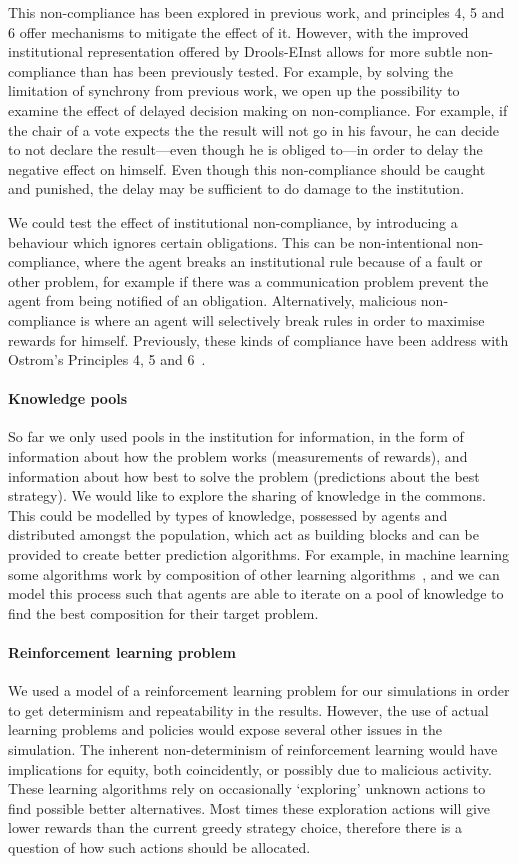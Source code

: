 This non-compliance has been explored in previous work, and principles
4, 5 and 6 offer mechanisms to mitigate the effect of it. However, with the
improved institutional representation offered by Drools-EInst allows for more
subtle non-compliance than has been previously tested. For example, by solving
the limitation of synchrony from previous work, we open up the possibility to
examine the effect of delayed decision making on non-compliance. For example,
if the chair of a vote expects the the result will not go in his favour, he
can decide to not declare the result---even though he is obliged to---in order to delay
the negative effect on himself. Even though this non-compliance should be
caught and punished, the delay may be sufficient to do damage to the
institution.

We could test the effect of
institutional non-compliance, by introducing a behaviour which ignores certain
obligations. This can be non-intentional non-compliance, where the agent
breaks an institutional rule because of a fault or other problem, for example
if there was a communication problem prevent the agent from being notified of
an obligation. Alternatively, malicious non-compliance is where an agent will
selectively break rules in order to maximise rewards for himself. Previously,
these kinds of compliance have been address with Ostrom's Principles 4, 5 and
6~\citep{Pitt2012b}.  

\paragraph{Knowledge pools} So far we only used pools in the institution for
information, in the form of information about how the problem works
(measurements of rewards), and information about how best to solve the problem
(predictions about the best strategy). We would like to explore the sharing of
knowledge in the commons. This could be modelled by types of knowledge,
possessed by agents and distributed amongst the population, which act as
building blocks and can be provided to create better prediction algorithms.
For example, in machine learning some algorithms work by composition of other
learning algorithms~\citep{Opitz1999}, and we can model this process such
that agents are able to iterate on a pool of knowledge to find the best
composition for their target problem.

\paragraph{Reinforcement learning problem} We used a model of a reinforcement
learning problem for our simulations in order to get determinism and
repeatability in the results. However, the use of actual learning problems and
policies would expose several other issues in the simulation. The inherent
non-determinism of reinforcement learning would have implications for equity,
both coincidently, or possibly due to malicious activity. These learning
algorithms rely on occasionally `exploring' unknown actions to find possible
better alternatives. Most times these exploration actions will give lower
rewards than the current greedy strategy choice, therefore there is a question
of how such actions should be allocated.

